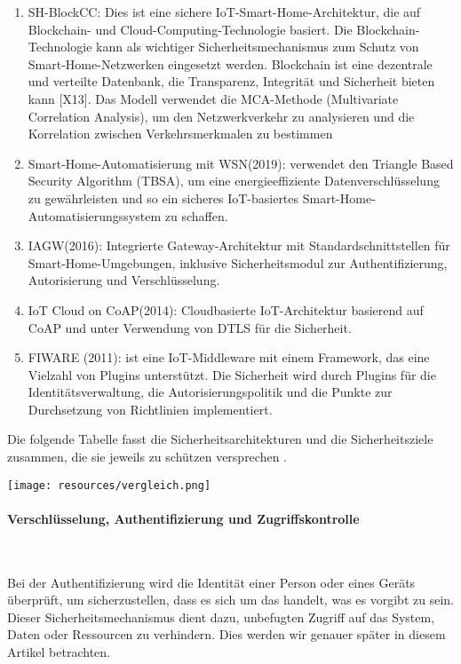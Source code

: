  \begin{enumerate}
     \item SH-BlockCC: Dies ist eine sichere IoT-Smart-Home-Architektur, die auf Blockchain- und Cloud-Computing-Technologie basiert. Die Blockchain-Technologie kann als wichtiger Sicherheitsmechanismus zum Schutz von Smart-Home-Netzwerken eingesetzt werden. Blockchain ist eine dezentrale und verteilte Datenbank, die Transparenz, Integrität und Sicherheit bieten kann [X13]. Das Modell verwendet die MCA-Methode (Multivariate Correlation Analysis), um den Netzwerkverkehr zu analysieren und die Korrelation zwischen Verkehrsmerkmalen zu bestimmen

    \item Smart-Home-Automatisierung mit WSN(2019): verwendet den Triangle Based Security Algorithm (TBSA), um eine energieeffiziente Datenverschlüsselung zu gewährleisten und so ein sicheres IoT-basiertes Smart-Home-Automatisierungssystem zu schaffen.

    \item IAGW(2016): Integrierte Gateway-Architektur mit Standardschnittstellen für Smart-Home-Umgebungen, inklusive Sicherheitsmodul zur Authentifizierung, Autorisierung und Verschlüsselung.

    \item IoT Cloud on CoAP(2014): Cloudbasierte IoT-Architektur basierend auf CoAP und unter Verwendung von DTLS für die Sicherheit.

    \item FIWARE (2011): ist eine IoT-Middleware mit einem Framework, das eine Vielzahl von Plugins unterstützt. Die Sicherheit wird durch Plugins für die Identitätsverwaltung, die Autorisierungspolitik und die Punkte zur Durchsetzung von Richtlinien implementiert.
 \end{enumerate}
Die folgende Tabelle fasst die Sicherheitsarchitekturen und die Sicherheitsziele zusammen, die sie jeweils zu schützen versprechen \cite{khatoun2022cybersecurity}.

\texttt{[image: resources/vergleich.png]}

\paragraph{Verschlüsselung, Authentifizierung und Zugriffskontrolle}
\

Bei der Authentifizierung wird die Identität einer Person oder eines Geräts überprüft, um sicherzustellen, dass es sich um das handelt, was es vorgibt zu sein. Dieser Sicherheitsmechanismus dient dazu, unbefugten Zugriff auf das System, Daten oder Ressourcen zu verhindern. Dies werden wir genauer  später in diesem Artikel betrachten.




